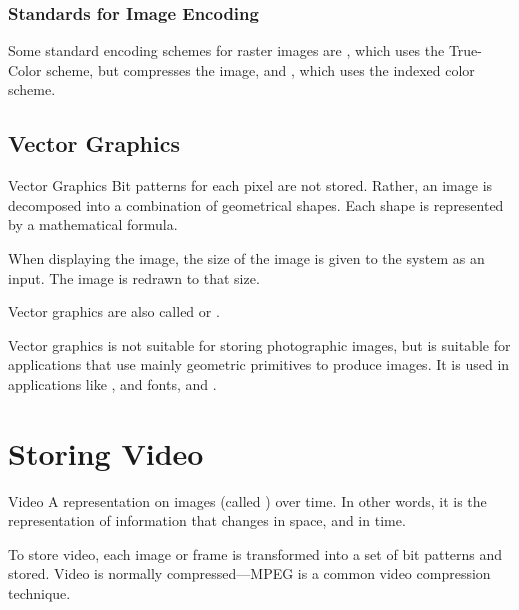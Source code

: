\documentclass[../notes.tex]{subfiles}
\begin{document}
				\subsubsection{Standards for Image Encoding}
					Some standard encoding schemes for raster images are , which uses the True-Color scheme, but compresses the image, and , which uses the indexed color scheme.
			\subsection{Vector Graphics}
				\begin{definition}{Vector Graphics}
					Bit patterns for each pixel are not stored. Rather, an image is decomposed into a combination of geometrical shapes. Each shape is represented by a mathematical formula.
					\begin{indentparagraph}
						When displaying the image, the size of the image is given to the system as an input. The image is redrawn to that size. 
					\end{indentparagraph}
					\begin{indentparagraph}
						Vector graphics are also called  or .
					\end{indentparagraph}
				\end{definition}
				Vector graphics is not suitable for storing photographic images, but is suitable for applications that use mainly geometric primitives to produce images. It is used in applications like ,  and  fonts, and \concept{Computer-aided design (CAD)}.
		\section{Storing Video}
			\begin{definition}{Video}
				A representation on images (called ) over time. In other words, it is the representation of information that changes in space, and in time.
				\begin{indentparagraph}
					To store video, each image or frame is transformed into a set of bit patterns and stored. Video is normally compressed---MPEG is a common video compression technique.
				\end{indentparagraph}
			\end{definition}
\end{document}
